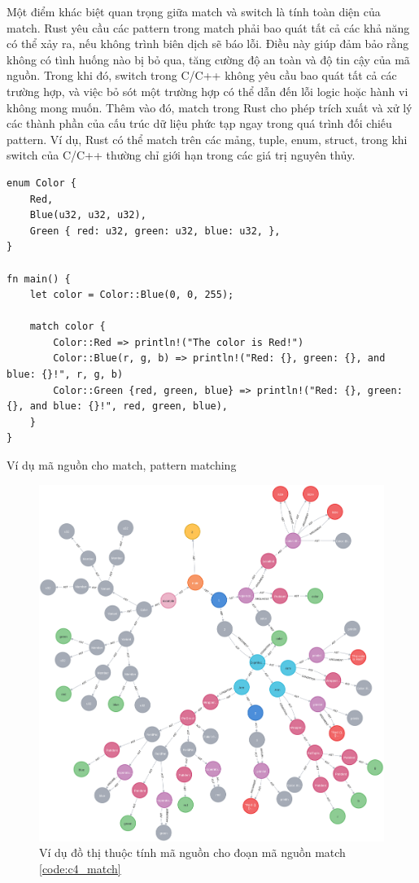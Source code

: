 Một điểm khác biệt quan trọng giữa match và switch là tính toàn diện của match. Rust yêu cầu các pattern trong match phải bao quát tất cả các khả năng có thể xảy ra, nếu không trình biên dịch sẽ báo lỗi. Điều này giúp đảm bảo rằng không có tình huống nào bị bỏ qua, tăng cường độ an toàn và độ tin cậy của mã nguồn. Trong khi đó, switch trong C/C++ không yêu cầu bao quát tất cả các trường hợp, và việc bỏ sót một trường hợp có thể dẫn đến lỗi logic hoặc hành vi không mong muốn. Thêm vào đó, match trong Rust cho phép trích xuất và xử lý các thành phần của cấu trúc dữ liệu phức tạp ngay trong quá trình đối chiếu pattern. Ví dụ, Rust có thể match trên các mảng, tuple, enum, struct, trong khi switch của C/C++ thường chỉ giới hạn trong các giá trị nguyên thủy.

\begin{listing}[H]
\begin{verbatim}
enum Color {
    Red,
    Blue(u32, u32, u32),
    Green { red: u32, green: u32, blue: u32, },
}

fn main() {
    let color = Color::Blue(0, 0, 255);

    match color {
        Color::Red => println!("The color is Red!")
        Color::Blue(r, g, b) => println!("Red: {}, green: {}, and blue: {}!", r, g, b)
        Color::Green {red, green, blue} => println!("Red: {}, green: {}, and blue: {}!", red, green, blue),
    }
}
\end{verbatim}
\caption{Ví dụ mã nguồn cho match, pattern matching}
\label{code:c4_match}
\end{listing}

\begin{figure}[H]
    \includegraphics[width=1\columnwidth]{figures/c4/c4_match.png}
    \centering
    \caption{Ví dụ đồ thị thuộc tính mã nguồn cho đoạn mã nguồn match \ref{code:c4_match}}
    \label{img:c4_match}
\end{figure}

